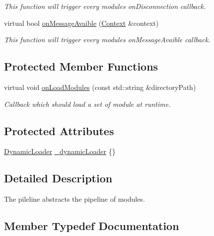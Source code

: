 \begin{DoxyCompactItemize}
\begin{DoxyCompactList}\small\item\em This function will trigger every module\textquotesingle{}s \textquotesingle{}on\+Disconnection\textquotesingle{} callback. \end{DoxyCompactList}\item 
virtual bool \mbox{\hyperlink{classo_z_1_1_pipeline_a5dc5181a699312bc35384ad706668e3c}{on\+Message\+Avaible}} (\mbox{\hyperlink{classo_z_1_1_context}{Context}} \&context)
\begin{DoxyCompactList}\small\item\em This function will trigger every module\textquotesingle{}s \textquotesingle{}on\+Message\+Avaible\textquotesingle{} callback. \end{DoxyCompactList}\end{DoxyCompactItemize}
\subsection*{Protected Member Functions}
\begin{DoxyCompactItemize}
\item 
virtual void \mbox{\hyperlink{classo_z_1_1_pipeline_a0265d90a5540e69b25069d5d96973c53}{on\+Load\+Modules}} (const std\+::string \&directory\+Path)
\begin{DoxyCompactList}\small\item\em Callback which should load a set of module at runtime. \end{DoxyCompactList}\end{DoxyCompactItemize}
\subsection*{Protected Attributes}
\begin{DoxyCompactItemize}
\item 
\mbox{\hyperlink{classo_z_1_1_dynamic_loader}{Dynamic\+Loader}} \mbox{\hyperlink{classo_z_1_1_pipeline_a6412859211177d78f0eebcecda79e841}{\+\_\+dynamic\+Loader}} \{\}
\end{DoxyCompactItemize}


\subsection{Detailed Description}
The pileline abstracts the pipeline of modules. 

\subsection{Member Typedef Documentation}
\mbox{\label{classo_z_1_1_pipeline_a5a71ea2f2d4be5b82589c1b8175722f4}} 
